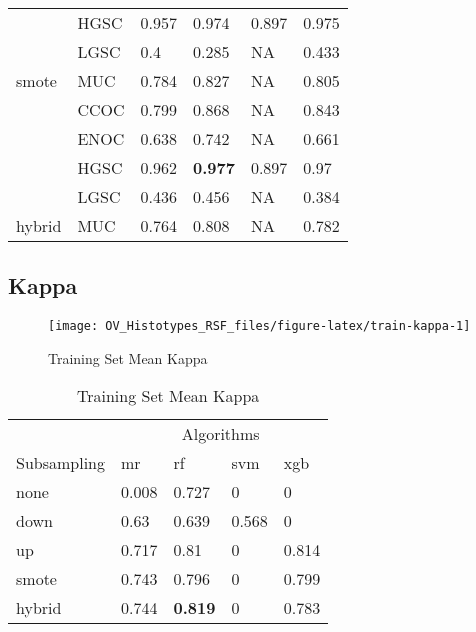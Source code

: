 \documentclass[
]{report}
\begin{document}
\begin{table}
\begin{tabular}[t]{l|l|l|l|l|l}
 & HGSC & 0.957 & 0.974 & 0.897 & 0.975\\
\cline{2-6}
 & LGSC & 0.4 & 0.285 & NA & 0.433\\
\cline{2-6}
\multirow{-5}{*}{\raggedright\arraybackslash smote} & MUC & 0.784 & 0.827 & NA & 0.805\\
\cline{1-6}
 & CCOC & 0.799 & 0.868 & NA & 0.843\\
\cline{2-6}
 & ENOC & 0.638 & 0.742 & NA & 0.661\\
\cline{2-6}
 & HGSC & 0.962 & \textbf{0.977} & 0.897 & 0.97\\
\cline{2-6}
 & LGSC & 0.436 & 0.456 & NA & 0.384\\
\cline{2-6}
\multirow{-5}{*}{\raggedright\arraybackslash hybrid} & MUC & 0.764 & 0.808 & NA & 0.782\\
\hline
\end{tabular}
\end{table}

\hypertarget{kappa}{%
\subsection{Kappa}\label{kappa}}

\begin{figure}[H]

{\centering \texttt{[image: OV\_Histotypes\_RSF\_files/figure-latex/train-kappa-1]} 

}

\caption{Training Set Mean Kappa}\label{fig:train-kappa}
\end{figure}

\begin{table}

\caption{\label{tab:train-kappa-table}Training Set Mean Kappa}
\centering
\begin{tabular}[t]{l|l|l|l|l}
\hline
\multicolumn{1}{c|}{ } & \multicolumn{4}{c}{Algorithms} \\
\cline{2-5}
Subsampling & mr & rf & svm & xgb\\
\hline
none & 0.008 & 0.727 & 0 & 0\\
\hline
down & 0.63 & 0.639 & 0.568 & 0\\
\hline
up & 0.717 & 0.81 & 0 & 0.814\\
\hline
smote & 0.743 & 0.796 & 0 & 0.799\\
\hline
hybrid & 0.744 & \textbf{0.819} & 0 & 0.783\\
\hline
\end{tabular}
\end{table}
\end{document}
